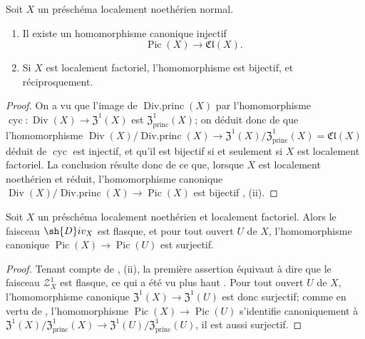 \begin{corollary}[21.6.10]
\label{IV.21.6.10}
Soit $X$ un préschéma localement noethérien normal.
\begin{enumerate}[label=(\roman*)]
  \item Il existe un homomorphisme canonique injectif
\[
\label{IV.21.6.10.1}
  \operatorname{Pic}(X)\to\mathfrak{Cl}(X).
  \tag{21.6.10.1}
\]

  \item Si $X$ est localement factoriel, l'homomorphisme  est bijectif, et réciproquement.
\end{enumerate}
\end{corollary}

\begin{proof}
On a vu  que l'image de $\operatorname{Div.princ}(X)$ par l'homomorphisme $\operatorname{cyc}:\operatorname{Div}(X)\to\mathfrak{Z}^1(X)$ est $\mathfrak{Z}^1_\mathrm{princ}(X)$;
on déduit donc de  que l'homomorphisme $\operatorname{Div}(X)/\operatorname{Div.princ}(X)\to\mathfrak{Z}^1(X)/\mathfrak{Z}^1_\mathrm{princ}(X)=\mathfrak{Cl}(X)$ déduit de $\operatorname{cyc}$ est injectif, et qu'il est bijectif si et seulement si $X$ est localement factoriel.
La conclusion résulte donc de ce que, lorsque $X$ est localement noethérien et réduit, l'homomorphisme canonique $\operatorname{Div}(X)/\operatorname{Div.princ}(X)\to\operatorname{Pic}(X)$  est bijectif , (ii).
\end{proof}

\begin{corollary}[21.6.11]
\label{IV.21.6.11}
Soit $X$ un préschéma localement noethérien et localement factoriel.
Alors le faisceau $\sh{D}iv_X$ est flasque, et pour tout ouvert $U$ de $X$, l'homomorphisme canonique $\operatorname{Pic}(X)\to\operatorname{Pic}(U)$ est surjectif.
\end{corollary}

\begin{proof}
Tenant compte de , (ii), la première assertion équivaut à dire que le faisceau $\mathscr{Z}_X^1$ est flasque, ce qui a été vu plus haut .
Pour tout ouvert $U$ de $X$, l'homomorphisme canonique $\mathfrak{Z}^1(X)\to\mathfrak{Z}^1(U)$ est donc surjectif;
comme en vertu de , l'homomorphisme $\operatorname{Pic}(X)\to\operatorname{Pic}(U)$ s'identifie canoniquement à $\mathfrak{Z}^1(X)/\mathfrak{Z}^1_\mathrm{princ}(X)\to\mathfrak{Z}^1(U)/\mathfrak{Z}^1_\mathrm{princ}(U)$, il est aussi surjectif.
\end{proof}


